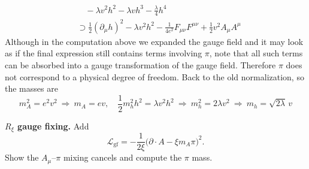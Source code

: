 \begin{solution}[23.2]
\[\begin{aligned}
		&\quad -\lambda v^{2}h^{2}-\lambda vh^{3}-\frac{\lambda}{4}h^{4}\\
		&\supset 
		\frac{1}{2}(\partial_{\mu}h)^{2}-\lambda v^2h^2
		-\frac{1}{4e^2}F_{\mu\nu}F^{\mu\nu}+\frac{1}{2}v^{2}A_{\mu}A^{\mu}
	\end{aligned}
	\]
	Although in the computation above we expanded the gauge field and it may look as if the final expression still contains terms involving $\pi$, note that all such terms can be absorbed into a gauge transformation of the gauge field. Therefore $\pi$ does not correspond to a physical degree of freedom.
	Back to the old normalization, so the masses are
	\[
	\boxed{
	m_A^2=e^2v^2\ \Rightarrow\ m_A=ev,\quad
	\frac12m_h^2h^2=\lambda v^2h^2\ \Rightarrow\ m_h^2=2\lambda v^2\ \Rightarrow\ m_h=\sqrt{2\lambda}\,v}
	\]
\end{solution}
\begin{problem}
    \textbf{\(R_\xi\) gauge fixing.} Add
    \[
        \mathcal{L}_{\text{gf}}=-\frac{1}{2\xi}\bigl(\partial\cdot A-\xi m_A\pi\bigr)^2.
    \]
    Show the \(A_\mu\)–\(\pi\) mixing cancels and compute the \(\pi\) mass.
\end{problem}
